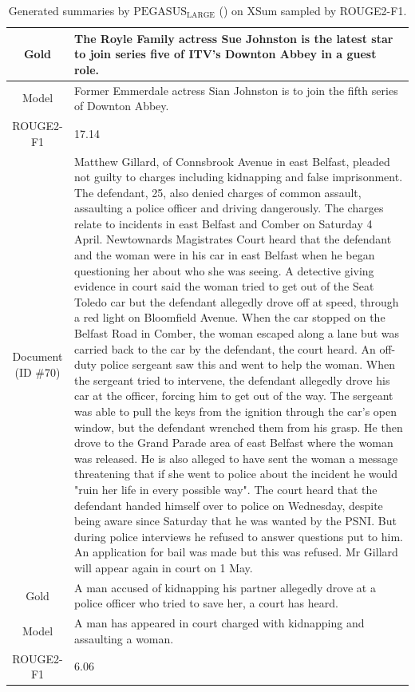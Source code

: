 \begin{table}[bth!]
\begin{tabular}{c|p{}}
\\ \hline
Gold & 
The Royle Family actress Sue Johnston is the latest star to join series five of ITV's Downton Abbey in a guest role.
\\ \hline
Model & 
Former Emmerdale actress Sian Johnston is to join the fifth series of Downton Abbey.
\\ \hline
ROUGE2-F1 & 
17.14
\\ \hline
\makecell{Document\\(ID \#70)} & 
Matthew Gillard, of Connsbrook Avenue in east Belfast, pleaded not guilty to charges including kidnapping and false imprisonment. The defendant, 25, also denied charges of common assault, assaulting a police officer and driving dangerously. The charges relate to incidents in east Belfast and Comber on Saturday 4 April. Newtownards Magistrates Court heard that the defendant and the woman were in his car in east Belfast when he began questioning her about who she was seeing. A detective giving evidence in court said the woman tried to get out of the Seat Toledo car but the defendant allegedly drove off at speed, through a red light on Bloomfield Avenue. When the car stopped on the Belfast Road in Comber, the woman escaped along a lane but was carried back to the car by the defendant, the court heard. An off-duty police sergeant saw this and went to help the woman. When the sergeant tried to intervene, the defendant allegedly drove his car at the officer, forcing him to get out of the way. The sergeant was able to pull the keys from the ignition through the car's open window, but the defendant wrenched them from his grasp. He then drove to the Grand Parade area of east Belfast where the woman was released. He is also alleged to have sent the woman a message threatening that if she went to police about the incident he would "ruin her life in every possible way". The court heard that the defendant handed himself over to police on Wednesday, despite being aware since Saturday that he was wanted by the PSNI. But during police interviews he refused to answer questions put to him. An application for bail was made but this was refused. Mr Gillard will appear again in court on 1 May.
\\ \hline
Gold & 
A man accused of kidnapping his partner allegedly drove at a police officer who tried to save her, a court has heard.
\\ \hline
Model & 
A man has appeared in court charged with kidnapping and assaulting a woman.
\\ \hline
ROUGE2-F1 & 
6.06
\\ \hline
\end{tabular}
\caption{Generated summaries by $\text{PEGASUS}_{\text{LARGE}}$ (\gnews) on XSum sampled by ROUGE2-F1.}
\end{table}
